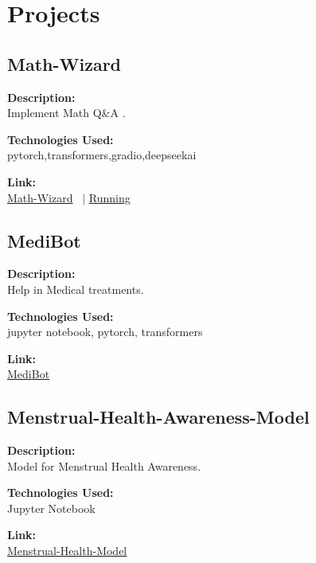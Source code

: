 \documentclass[a4paper,10pt]{article}
\begin{document}
\section{Projects}

\subsection*{Math-Wizard}

\noindent
\begin{minipage}[t]{0.4\textwidth}
  \textbf{Description:}\\
  Implement Math Q\&A .
\end{minipage}%
\begin{minipage}[t]{0.4\textwidth}
  \textbf{Technologies Used:}\\
  pytorch,transformers,gradio,deepseekai
\end{minipage}%
\begin{minipage}[t]{0.2\textwidth}
  \textbf{Link:}\\
  \href{https://github.com/EchoSingh/Math-Wizard}{Math-Wizard} \ $|$
  \href{https://huggingface.co/spaces/adi2606/Math_Wizard}{Running}
\end{minipage}

\subsection*{MediBot}

\noindent
\begin{minipage}[t]{0.4\textwidth}
  \textbf{Description:}\\
  Help in Medical treatments.
\end{minipage}%
\begin{minipage}[t]{0.4\textwidth}
  \textbf{Technologies Used:}\\
  jupyter notebook, pytorch, transformers
\end{minipage}%
\begin{minipage}[t]{0.2\textwidth}
  \textbf{Link:}\\
  \href{https://github.com/EchoSingh/MediBot}{MediBot}
\end{minipage}

\subsection*{Menstrual-Health-Awareness-Model}

\noindent
\begin{minipage}[t]{0.4\textwidth}
  \textbf{Description:}\\
  Model for Menstrual Health Awareness.
\end{minipage}%
\begin{minipage}[t]{0.4\textwidth}
  \textbf{Technologies Used:}\\
  Jupyter Notebook
\end{minipage}%
\begin{minipage}[t]{0.2\textwidth}
  \textbf{Link:}\\
  \href{https://huggingface.co/adi2606/Menstrual-Health-Awareness-Chatbot}{Menstrual-Health-Model}
\end{minipage}
\end{document}
